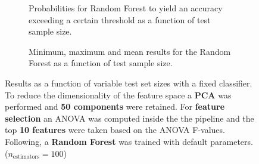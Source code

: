 \begin{figure}
    \captionsetup[subfigure]{justification=justified,singlelinecheck=false}
    \begin{subfigure}[t]{0.61\textwidth}
        
        \caption{Probabilities for Random Forest to yield an accuracy exceeding a certain threshold as a function of test sample size.}
    \end{subfigure}
    \hspace{3.0mm}
    \begin{subfigure}[t]{0.34\textwidth}
        
        \caption{Minimum, maximum and mean results for the Random Forest as a function of test sample size.}
    \end{subfigure}
    \caption[Effects of varying test sample size. Random Forest; Preprocessing: PCA ($n_\text{components} = \num{50}$); ANOVA feature selection ($k_\text{best} = \num{10}$)]{Results as a function of variable test set sizes with a fixed classifier. To reduce the dimensionality of the feature space a \textbf{PCA} was performed and \textbf{50 components} were retained. For \textbf{feature selection} an ANOVA was computed inside the the pipeline and the top \textbf{10 features} were taken based on the ANOVA F-values. Following, a \textbf{{Random Forest}} was trained with default parameters. ($n_\text{estimators}=\num{100}$)}
    \label{fig:PCA_50_components_10_best_selected_RandomForest}
\end{figure}

